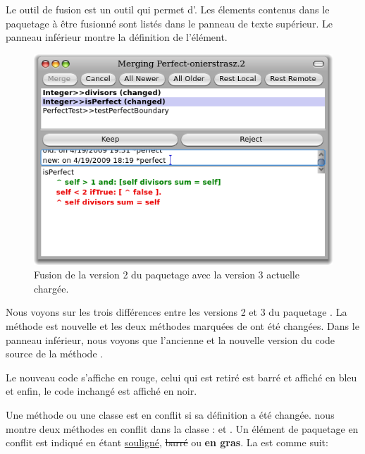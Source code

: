 \documentclass[a4paper,10pt,twoside]{book}
\begin{document}

Le outil de fusion est un outil qui permet d'. Les élements contenus
dans le paquetage à être fusionné sont listés dans le panneau de texte
supérieur. Le panneau inférieur montre la définition de l'élément.

\begin{figure}[ht]\centering
	\includegraphics[width=.8\textwidth]{mergeTool}
	\caption{Fusion de la version 2 du paquetage  avec la
      version 3 actuelle chargée.
	}
\end{figure}

Nous voyons sur  les trois différences entre les
versions 2 et 3 du paquetage  . La méthode
 est nouvelle et les deux méthodes
marquées de  ont été changées. Dans le panneau inférieur,
nous voyons que l'ancienne et la nouvelle version du code source de la
méthode  .


Le nouveau code s'affiche en rouge, celui qui est retiré est barré et
affiché en bleu et enfin, le code inchangé est affiché en noir.

Une méthode ou une classe est en conflit si sa définition a été
changée.  nous montre deux méthodes en conflit dans
la classe :  et . 
Un élément de paquetage en conflit est indiqué en étant
\underline{souligné}, \sout{barré} ou {\bf en gras}. La  est comme suit:
\end{document}
